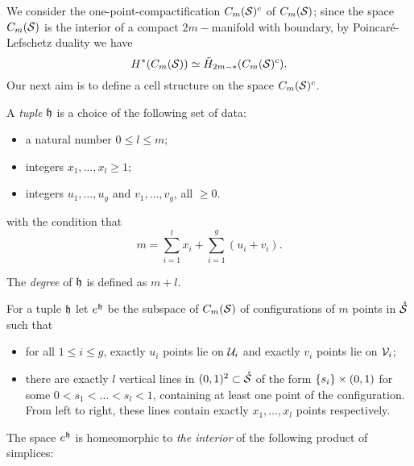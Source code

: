 We consider the one-point-compactification $C_m(\mathcal{S})^c$ of $C_m(\mathcal{S})$; since the space $C_m(\mathcal{S})$ is the interior of a compact
$2m-$manifold with boundary, by Poincaré-Lefschetz
duality we have
\[
 H^*(C_m(\mathcal{S}))\simeq \tilde H_{2m-*}(C_m(\mathcal{S})^c).
\]
Our next aim is to define a cell structure on the space $C_m(\mathcal{S})^c$.
\begin{defn}
\label{def:ehopen}
A \emph{tuple} $\mathfrak{h}$ is a choice of the following set of data:
 \begin{itemize}
  \item a natural number $0\leq l\leq m$;
  \item integers $x_1,\dots,x_l\geq 1$;
  \item integers $u_1,\dots,u_g$ and $v_1,\dots,v_g$, all $\geq 0$.
 \end{itemize}
with the condition that
\[
 m=\sum_{i=1}^lx_i+\sum_{i=1}^g(u_i+v_i).
\]

The \emph{degree} of $\mathfrak{h}$ is defined as $m+l$.

For a tuple $\mathfrak{h}$ let $e^{\mathfrak{h}}$ be the subspace
of $C_m(\mathcal{S})$ of configurations of $m$ points in $\mathring{\mathcal{S}}$ such that
\begin{itemize}
 \item for all $1\leq i\leq g$, exactly $u_i$ points lie on $\mathcal{U}_i$
 and exactly $v_i$ points lie on $\mathcal{V}_i$;
 \item there are exactly $l$ vertical lines in $(0,1)^2\subset\mathring{\mathcal{S}}$ of the
 form $\left\{s_i\right\}\times(0,1)$ for some $0<s_1<\dots<s_l<1$, containing at least one
 point of the configuration. From left to right, these lines contain exactly $x_1,\dots,x_l$ points
 respectively.
\end{itemize}
\end{defn}
The space $e^{\mathfrak{h}}$ is homeomorphic to \emph{the interior} of the following product of simplices:

